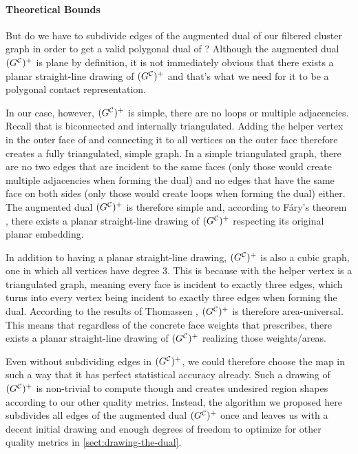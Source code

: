 \paragraph{Theoretical Bounds}

But do we have to subdivide edges of the augmented dual of our filtered cluster graph \clustergraph{} in order to get a valid polygonal dual of \clustergraph{}?
Although the augmented dual $(G^\mathcal{C}_{})^+$ is plane by definition, it is not immediately obvious that there exists a planar straight-line drawing of $(G^\mathcal{C}_{})^+$ \emdash{} and that's what we need for it to be a polygonal contact representation.

In our case, however, $(G^\mathcal{C}_{})^+$ is simple, \ie{} there are no loops or multiple adjacencies.
Recall that \clustergraph{} is biconnected and internally triangulated.
Adding the helper vertex in the outer face of \clustergraph{} and connecting it to all vertices on the outer face therefore creates a fully triangulated, simple graph.
In a simple triangulated graph, there are no two edges that are incident to the same faces (only those would create multiple adjacencies when forming the dual) and no edges that have the same face on both sides (only those would create loops when forming the dual) either.
The augmented dual $(G^\mathcal{C}_{})^+$ is therefore simple and, according to Fáry's theorem \cite{fary1948straight}, there exists a planar straight-line drawing of $(G^\mathcal{C}_{})^+$ respecting its original planar embedding.

In addition to having a planar straight-line drawing, $(G^\mathcal{C}_{})^+$ is also a cubic graph, \ie{} one in which all vertices have degree 3.
This is because \clustergraph{} with the helper vertex is a triangulated graph, meaning every face is incident to exactly three edges, which turns into every vertex being incident to exactly three edges when forming the dual.
According to the results of Thomassen \cite{thomassen1992plane}, $(G^\mathcal{C}_{})^+$ is therefore area-universal.
This means that regardless of the concrete face weights that \clustergraph{} prescribes, there exists a planar straight-line drawing of $(G^\mathcal{C}_{})^+$ realizing those weights/areas.

Even without subdividing edges in $(G^\mathcal{C}_{})^+$, we could therefore choose the map \initmap{} in such a way that it has perfect statistical accuracy already.
Such a drawing of $(G^\mathcal{C}_{})^+$ is non-trivial to compute though and creates undesired region shapes according to our other quality metrics.
Instead, the algorithm we proposed here subdivides all edges of the augmented dual $(G^\mathcal{C}_{})^+$ once and leaves us with a decent initial drawing and enough degrees of freedom to optimize for other quality metrics in \cref{sect:drawing-the-dual}.
